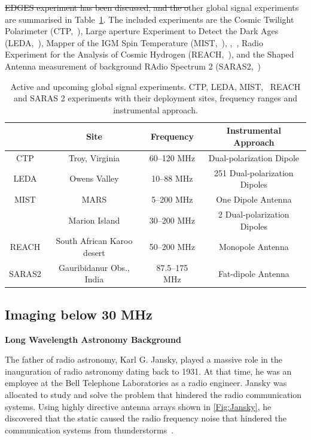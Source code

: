 \st{EDGES experiment has been discussed, and the o}ther global signal experiments are summarised in Table~\ref{Tab:CD}. The included experiments are the Cosmic Twilight Polarimeter (CTP,~\citet{2019ApJ...883..126N}),  Large aperture Experiment to Detect the Dark Ages (LEDA,~\citet{2012JAI.....150004T, 2018MNRAS.478.4193P}), Mapper of the IGM Spin Temperature (MIST,~\citet{inproceedings}),   \prizm,~\citet{2019JAI.....850004P}, Radio Experiment for the Analysis of Cosmic Hydrogen (REACH,~\citet{8879199}), and the Shaped Antenna measurement of background RAdio Spectrum 2 (SARAS2,~\citet{2013ExA....36..319P})  

\begin{table}
	\centering
	\begin{tabular}{ c|ccc} 
		& Site & Frequency & Instrumental Approach \\
		\hline
		CTP & Troy, Virginia & 60--120 MHz & Dual-polarization Dipole \\
		
		LEDA & Owens Valley & 10--88 MHz & 251 Dual-polarization Dipoles \\
		
		MIST & MARS & 5--200 MHz & One Dipole Antenna \\
		\prizm\ & Marion Island & 30--200 MHz & 2 Dual-polarization Dipoles \\
		REACH & South African Karoo desert & 50--200 MHz & Monopole Antenna \\
		SARAS2 & Gauribidanur Obs., India & 87.5--175 MHz & Fat-dipole Antenna \\
		\hline
	\end{tabular}
	\caption{Active and upcoming global signal experiments. CTP, LEDA, MIST, \prizm\, REACH and SARAS 2 experiments with their deployment sites, frequency ranges and instrumental approach.}
	\label{Tab:CD}
\end{table}  

\subsection{Imaging below 30 MHz}

{\bf{Long Wavelength Astronomy Background}}

The father of radio astronomy, Karl G. Jansky, played a massive role in the inauguration of radio astronomy dating back to 1931. At that time, he was an employee at the Bell Telephone Laboratories as a radio engineer. Jansky was allocated to study and solve the problem that hindered the radio communication systems. Using highly directive antenna arrays shown in \autoref{Fig:Jansky}, he discovered that the static caused the radio frequency noise that hindered the communication systems from thunderstorms~\citep{book:BasicsofRA, book:RA}.

